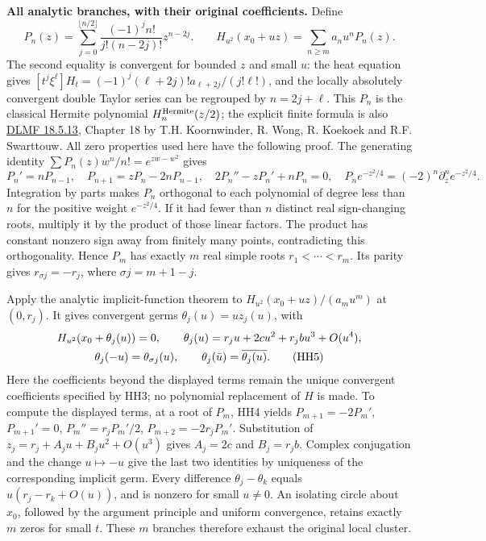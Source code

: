 \documentclass[11pt,a4paper]{article}
\theoremstyle{definition}\newtheorem{definition}[theorem]{Definition}
\begin{document}
\HH\textbf{All analytic branches, with their original coefficients.}
Define
\[
 P_n(z)=\sum_{j=0}^{\lfloor n/2\rfloor}
       \frac{(-1)^jn!}{j!(n-2j)!}z^{n-2j}.
 \qquad
 H_{u^2}(x_0+uz)=\sum_{n\ge m}a_nu^nP_n(z).
 \tag{HH3}\label{hh:branches-source}
\]
The second equality is convergent for bounded $z$ and small $u$:
the heat equation gives
$[t^j\xi^\ell]H_t=(-1)^j(\ell+2j)!a_{\ell+2j}/(j!\ell!)$,
and the locally absolutely convergent double Taylor series can be
regrouped by $n=2j+\ell$.
This $P_n$ is the classical Hermite polynomial $H_n^{\rm Hermite}(z/2)$;
the explicit finite formula is also
\href{https://dlmf.nist.gov/18.5.E13}{DLMF 18.5.13},
Chapter 18 by T.H. Koornwinder, R. Wong, R. Koekoek and
R.F. Swarttouw. All zero properties used here have the following proof.
The generating identity $\sum P_n(z)w^n/n!=e^{zw-w^2}$ gives
\[
 P_n'=nP_{n-1},\quad P_{n+1}=zP_n-2nP_{n-1},\quad
 2P_n''-zP_n'+nP_n=0,\quad
 P_ne^{-z^2/4}=(-2)^n\partial_z^n e^{-z^2/4}.
 \tag{HH4}
\]
Integration by parts makes $P_n$ orthogonal to each polynomial of
degree less than $n$ for the positive weight $e^{-z^2/4}$.
If it had fewer than $n$ distinct real sign-changing roots, multiply
it by the product of those linear factors. The product has constant
nonzero sign away from finitely many points, contradicting this
orthogonality. Hence $P_m$ has exactly $m$ real simple roots
$r_1<\cdots<r_m$. Its parity gives $r_{\sigma j}=-r_j$, where
$\sigma j=m+1-j$.

Apply the analytic implicit-function theorem to
$H_{u^2}(x_0+uz)/(a_mu^m)$ at $(0,r_j)$.
It gives convergent germs $\theta_j(u)=uz_j(u)$, with
\begin{gather}
 H_{u^2}(x_0+\theta_j(u))=0,\qquad
 \theta_j(u)=r_ju+2cu^2+r_jbu^3+O(u^4),\notag\\
 \theta_j(-u)=\theta_{\sigma j}(u),\qquad
 \theta_j(\bar u)=\overline{\theta_j(u)} .
 \tag{HH5}\label{hh:theta}
\end{gather}
Here the coefficients beyond the displayed terms remain the unique
convergent coefficients specified by HH3; no polynomial replacement
of $H$ is made. To compute the displayed terms, at a root of $P_m$,
HH4 yields $P_{m+1}=-2P_m'$, $P_{m+1}'=0$,
$P_m''=r_jP_m'/2$, $P_{m+2}=-2r_jP_m'$.
Substitution of $z_j=r_j+A_ju+B_ju^2+O(u^3)$ gives
$A_j=2c$ and $B_j=r_jb$.
Complex conjugation and the change $u\mapsto-u$ give the last two
identities by uniqueness of the corresponding implicit germ.
Every difference $\theta_j-\theta_k$ equals
$u(r_j-r_k+O(u))$, and is nonzero for small $u\ne0$.
An isolating circle about $x_0$, followed by the argument principle
and uniform convergence, retains exactly $m$ zeros for small $t$.
These $m$ branches therefore exhaust the original local cluster.
\end{document}
